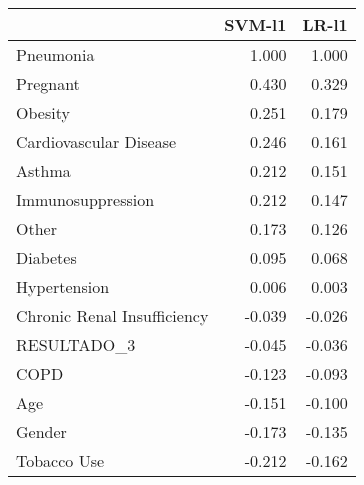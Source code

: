 \begin{tabular}{lrr}
\toprule
{} &  SVM-l1 &  LR-l1 \\
\midrule
Pneumonia                   &   1.000 &  1.000 \\
Pregnant                    &   0.430 &  0.329 \\
Obesity                     &   0.251 &  0.179 \\
Cardiovascular Disease      &   0.246 &  0.161 \\
Asthma                      &   0.212 &  0.151 \\
Immunosuppression           &   0.212 &  0.147 \\
Other                       &   0.173 &  0.126 \\
Diabetes                    &   0.095 &  0.068 \\
Hypertension                &   0.006 &  0.003 \\
Chronic Renal Insufficiency &  -0.039 & -0.026 \\
RESULTADO\_3                 &  -0.045 & -0.036 \\
COPD                        &  -0.123 & -0.093 \\
Age                         &  -0.151 & -0.100 \\
Gender                      &  -0.173 & -0.135 \\
Tobacco Use                 &  -0.212 & -0.162 \\
\bottomrule
\end{tabular}
